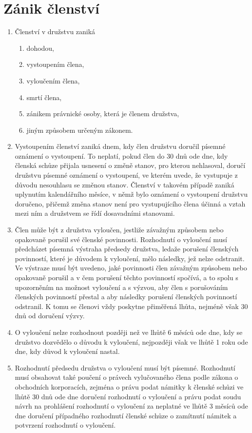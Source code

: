 \section{Zánik členství}
\begin{enumerate}
    \item Členství v družstvu zaniká
    \begin{enumerate}[label=\alph*.]
        \item dohodou,
        \item vystoupením člena,
        \item vyloučením člena,
        \item smrtí člena,
        \item zánikem právnické osoby, která je členem družstva,
        \item jiným způsobem určeným zákonem.
    \end{enumerate}
    \item Vystoupením členství zaniká dnem, kdy člen družstvu doručil písemné oznámení o vystoupení. To neplatí, pokud člen do 30 dnů ode dne, kdy členská schůze přijala usnesení o změně stanov, pro kterou nehlasoval, doručí družstvu písemné oznámení o vystoupení, ve kterém uvede, že vystupuje z důvodu nesouhlasu se změnou stanov. Členství v takovém případě zaniká uplynutím kalendářního měsíce, v němž bylo oznámení o vystoupení družstvu doručeno, přičemž změna stanov není pro vystupujícího člena účinná a vztah mezi ním a družstvem se řídí dosavadními stanovami.
    \item Člen může být z družstva vyloučen, jestliže závažným způsobem nebo opakovaně porušil své členské povinnosti. Rozhodnutí o vyloučení musí předcházet písemná výstraha předsedy družstva, ledaže porušení členských povinností, které je důvodem k vyloučení, mělo následky, jež nelze odstranit. Ve výstraze musí být uvedeno, jaké povinnosti člen závažným způsobem nebo opakovaně porušil a v čem porušení těchto povinností spočívá, a to spolu s upozorněním na možnost vyloučení a s výzvou, aby člen s porušováním členských povinností přestal a aby následky porušení členských povinností odstranil. K tomu se členovi vždy poskytne přiměřená lhůta, nejméně však 30 dnů od doručení výzvy.
    \item O vyloučení nelze rozhodnout později než ve lhůtě 6 měsíců ode dne, kdy se družstvo dozvědělo o důvodu k vyloučení, nejpozději však ve lhůtě 1 roku ode dne, kdy důvod k vyloučení nastal.
    \item Rozhodnutí předsedu družstva o vyloučení musí být písemné. Rozhodnutí musí obsahovat také poučení o právech vylučovaného člena podle zákona o obchodních korporacích, zejména o právu podat námitky k členské schůzi ve lhůtě 30 dnů ode dne doručení rozhodnutí o vyloučení a právu podat soudu návrh na prohlášení rozhodnutí o vyloučení za neplatné ve lhůtě 3 měsíců ode dne doručení případného rozhodnutí členské schůze o zamítnutí námitek a potvrzení rozhodnutí o vyloučení.

\end{enumerate}
